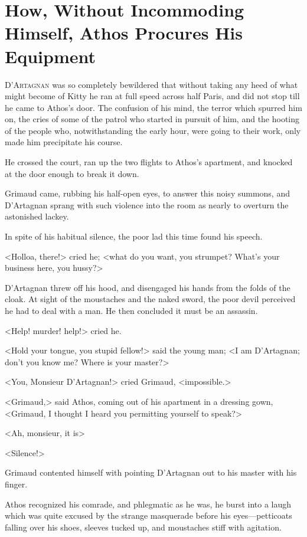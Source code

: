 
\chapter[Athos Procures His Equipment]{How, Without Incommoding Himself, Athos Procures His Equipment} 
	
\lettrine{D}{'Artagnan} was so completely bewildered that without taking any heed of what might become of Kitty he ran at full speed across half Paris, and did not stop till he came to Athos's door. The confusion of his mind, the terror which spurred him on, the cries of some of the patrol who started in pursuit of him, and the hooting of the people who, notwithstanding the early hour, were going to their work, only made him precipitate his course. 

He crossed the court, ran up the two flights to Athos's apartment, and knocked at the door enough to break it down. 

Grimaud came, rubbing his half-open eyes, to answer this noisy summons, and D'Artagnan sprang with such violence into the room as nearly to overturn the astonished lackey. 

In spite of his habitual silence, the poor lad this time found his speech. 

<Holloa, there!> cried he; <what do you want, you strumpet? What's your business here, you hussy?> 

D'Artagnan threw off his hood, and disengaged his hands from the folds of the cloak. At sight of the moustaches and the naked sword, the poor devil perceived he had to deal with a man. He then concluded it must be an assassin. 

<Help! murder! help!> cried he. 

<Hold your tongue, you stupid fellow!> said the young man; <I am D'Artagnan; don't you know me? Where is your master?> 

<You, Monsieur D'Artagnan!> cried Grimaud, <impossible.> 

<Grimaud,> said Athos, coming out of his apartment in a dressing gown, <Grimaud, I thought I heard you permitting yourself to speak?> 

<Ah, monsieur, it is\longdash> 

<Silence!> 

Grimaud contented himself with pointing D'Artagnan out to his master with his finger. 

Athos recognized his comrade, and phlegmatic as he was, he burst into a laugh which was quite excused by the strange masquerade before his eyes—petticoats falling over his shoes, sleeves tucked up, and moustaches stiff with agitation. 

